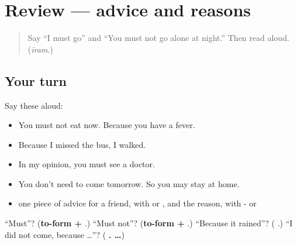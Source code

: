 \section[(review)]{Review — advice and reasons}

\label{lesson:TA-R287-advice-and-reasons}



\begin{quote}
Say \textquotedblleft{}I must go\textquotedblright{} and \textquotedblleft{}You must not go alone at night.\textquotedblright{} Then read \textbf{} aloud. (\emph{īram}.)
\end{quote}

\subsection*{Your turn}
Say these aloud:

\begin{itemize}
\raggedright
  \item You must not eat now. Because you have a fever.
  \item Because I missed the bus, I walked.
  \item In my opinion, you must see a doctor.
  \item You don't need to come tomorrow. So you may stay at home.
  \item one piece of advice for a friend, with  or , and the reason, with - or 
\end{itemize}

\begin{tcolorbox}[breakable,colback=teal!4,colframe=teal!35!black,title={Before you move on}]
\textquotedblleft{}Must\textquotedblright{}? (\textbf{to-form + }.) \textquotedblleft{}Must not\textquotedblright{}? (\textbf{to-form + }.) \textquotedblleft{}Because it rained\textquotedblright{}? (\textbf{ }.) \textquotedblleft{}I did not come, because …\textquotedblright{}? (\textbf{ .  …})
\end{tcolorbox}
